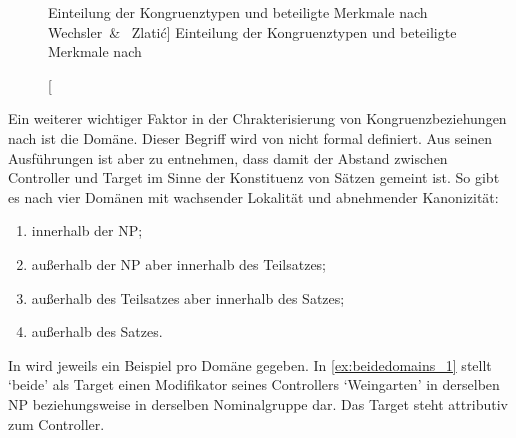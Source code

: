 \begin{figure}
\centering
{}
\caption%
	[Einteilung der Kongruenztypen und beteiligte Merkmale nach Wechsler~\&~%
	Zlatić]%
	{Einteilung der Kongruenztypen und beteiligte Merkmale nach
	\citet{wechslerzlatic2003}}
\label{fig:termini}
\end{figure}

Ein weiterer wichtiger Faktor in der Chrakterisierung von Kongruenzbeziehungen
nach \citet{corbett2006} ist die Domäne. Dieser Begriff wird von
\citet{corbett2006} nicht formal definiert. Aus seinen Ausführungen ist aber zu
entnehmen, dass damit der Abstand zwischen Controller und Target im Sinne der
Konstituenz von Sätzen gemeint ist. So gibt es nach \citet[54]{corbett2006}
vier Domänen mit wachsender Lokalität und abnehmender Kanonizität:

\begin{enumerate}[noitemsep]
	\item innerhalb der NP;
	\item außerhalb der NP aber innerhalb des Teilsatzes;
	\item außerhalb des Teilsatzes aber innerhalb des Satzes;
	\item außerhalb des Satzes.
\end{enumerate}

In  wird jeweils ein Beispiel
pro Domäne gegeben. In \cref{ex:beidedomains_1} stellt  `beide' als
Target einen Modifikator seines Controllers  `Weingarten' in
derselben NP beziehungsweise in derselben Nominalgruppe dar. Das Target steht
attributiv zum Controller.

